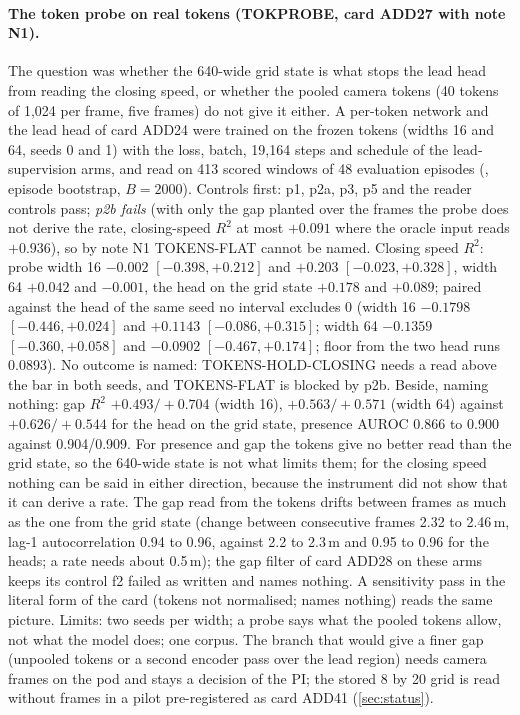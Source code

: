 \paragraph{The token probe on real tokens (TOKPROBE, card ADD27 with note N1).} The question was whether the 640-wide grid state is what stops the lead head from reading the closing speed, or whether the pooled camera tokens (40 tokens of 1,024 per frame, five frames) do not give it either. A per-token network and the lead head of card ADD24 were trained on the frozen tokens (widths 16 and 64, seeds 0 and 1) with the loss, batch, 19,164 steps and schedule of the lead-supervision arms, and read on 413 scored windows of 48 evaluation episodes (, episode bootstrap, $B=2000$). Controls first: p1, p2a, p3, p5 and the reader controls pass; \emph{p2b fails} (with only the gap planted over the frames the probe does not derive the rate, closing-speed $R^2$ at most $+0.091$ where the oracle input reads $+0.936$), so by note N1 TOKENS-FLAT cannot be named. Closing speed $R^2$: probe width 16 $-0.002$ $[-0.398,+0.212]$ and $+0.203$ $[-0.023,+0.328]$, width 64 $+0.042$ and $-0.001$, the head on the grid state $+0.178$ and $+0.089$; paired against the head of the same seed no interval excludes 0 (width 16 $-0.1798$ $[-0.446,+0.024]$ and $+0.1143$ $[-0.086,+0.315]$; width 64 $-0.1359$ $[-0.360,+0.058]$ and $-0.0902$ $[-0.467,+0.174]$; floor from the two head runs 0.0893). No outcome is named: TOKENS-HOLD-CLOSING needs a read above the bar in both seeds, and TOKENS-FLAT is blocked by p2b. Beside, naming nothing: gap $R^2$ $+0.493/+0.704$ (width 16), $+0.563/+0.571$ (width 64) against $+0.626/+0.544$ for the head on the grid state, presence AUROC 0.866 to 0.900 against 0.904/0.909. For presence and gap the tokens give no better read than the grid state, so the 640-wide state is not what limits them; for the closing speed nothing can be said in either direction, because the instrument did not show that it can derive a rate. The gap read from the tokens drifts between frames as much as the one from the grid state (change between consecutive frames 2.32 to 2.46\,m, lag-1 autocorrelation 0.94 to 0.96, against 2.2 to 2.3\,m and 0.95 to 0.96 for the heads; a rate needs about 0.5\,m); the gap filter of card ADD28 on these arms keeps its control f2 failed as written and names nothing. A sensitivity pass in the literal form of the card (tokens not normalised; names nothing) reads the same picture. Limits: two seeds per width; a probe says what the pooled tokens allow, not what the model does; one corpus. The branch that would give a finer gap (unpooled tokens or a second encoder pass over the lead region) needs camera frames on the pod and stays a decision of the PI; the stored 8 by 20 grid is read without frames in a pilot pre-registered as card ADD41 (\cref{sec:status}).

